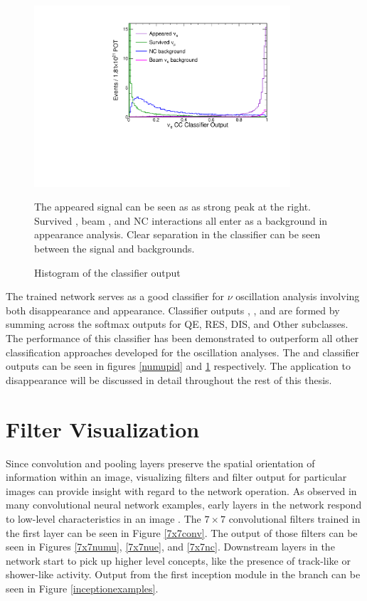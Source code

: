 \begin{figure}
\begin{center}
\includegraphics[width=0.85\textwidth]{figures/cnn/nue_pid_dist.pdf}
\end{center}
\caption{Histogram of the \numu classifier output}{
The appeared \nue signal can be seen as as strong peak at the right.
Survived \numu, beam \nue, and NC interactions all enter as a background
in \nue appearance analysis.
Clear separation in the classifier can be seen between the signal and backgrounds.
}
\label{nuepid}
\end{figure}


The trained network serves as a good classifier for $\nu$ oscillation analysis
involving both \numu disappearance and \nue appearance.
Classifier outputs \nue, \numu, and \nutau are formed by summing across the
softmax outputs for QE, RES, DIS, and Other subclasses.
The performance of this classifier has been demonstrated to outperform
all other classification approaches developed for the \nova oscillation
analyses.
The \numu and \nue classifier outputs can be seen in figures \ref{numupid} and
\ref{nuepid} respectively.
The application to \numu disappearance will be discussed in detail throughout
the rest of this thesis.


\section{Filter Visualization}

Since convolution and pooling layers preserve the spatial orientation of
information within an image, visualizing filters and filter output for
particular images can provide insight with regard to the network operation.
As observed in many convolutional neural network examples,
early layers in the network respond to low-level characteristics
in an image \cite{lecun2015deep}.
The $7\times7$ convolutional filters trained in the first layer can be seen
in Figure \ref{7x7conv}.
The output of those filters can be seen in Figures \ref{7x7numu}, \ref{7x7nue},
and \ref{7x7nc}.
Downstream layers in the network start to pick up higher level concepts,
like the presence of track-like or shower-like activity.
Output from the first inception module in the \yview branch can be seen
in Figure \ref{inceptionexamples}.



